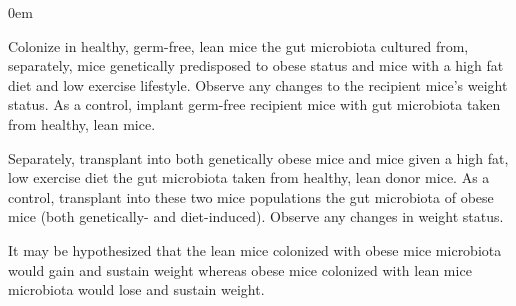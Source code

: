 \documentclass[11pt,letterpaper,final] {article}
\newenvironment{exercise}[2][Exercise]{\begin{trivlist}
	\item[\hskip \labelsep {\bfseries #1}\hskip \labelsep {\bfseries #2.}]}{\end{trivlist}}
\newenvironment{problem}[2][Problem]{\begin{addmargin}[0.5in]{0em} \begin{trivlist}
	\item[\hskip \labelsep {\bfseries #1}\hskip \labelsep {\bfseries #2.}]}{\end{trivlist}\end{addmargin}}
\begin{document}
\begin{exercise}[Exercise]{1}
\begin{problem}[Problem]{F}
	Colonize in healthy, germ-free, lean mice the gut microbiota cultured from, separately, mice genetically predisposed to obese status and mice with a high fat diet and low exercise lifestyle. Observe any changes to the recipient mice's weight status. As a control, implant germ-free recipient mice with gut microbiota taken from healthy, lean mice.
	
	Separately, transplant into both genetically obese mice and mice given a high fat, low exercise diet the gut microbiota taken from healthy, lean donor mice. As a control, transplant into these two mice populations the gut microbiota of obese mice (both genetically- and diet-induced). Observe any changes in weight status.
	
	It may be hypothesized that the lean mice colonized with obese mice microbiota would gain and sustain weight whereas obese mice colonized with lean mice microbiota would lose and sustain weight.
	
	\end{problem}
\end{exercise}
\end{document}

